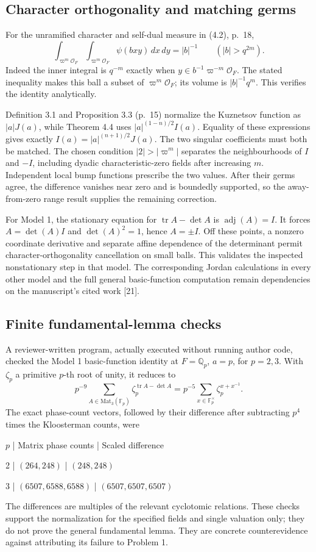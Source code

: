 \documentclass[10pt]{article}
\begin{document}
\subsection*{Character orthogonality and matching germs}
For the unramified character and self-dual measure in (4.2), p. 18, \[\int_{\varpi^m\mathcal O_F}\int_{\varpi^m\mathcal O_F}
 \psi(bxy)\,dx\,dy=|b|^{-1}\qquad (|b|>q^{2m}).\] Indeed the inner integral is \(q^{-m}\) exactly when \(y\in b^{-1}\varpi^{-m}\mathcal O_F\). The stated inequality makes this ball a subset of \(\varpi^m\mathcal O_F\); its volume is \(|b|^{-1}q^m\). This verifies the identity analytically.\par
Definition 3.1 and Proposition 3.3 (p. 15) normalize the Kuznetsov function as \(|a|J(a)\), while Theorem 4.4 uses \(|a|^{(1-n)/2}I(a)\). Equality of these expressions gives exactly \(I(a)=|a|^{(n+1)/2}J(a)\). The two singular coefficients must both be matched. The chosen condition \(|2|>|\varpi^m|\) separates the neighbourhoods of \(I\) and \(-I\), including dyadic characteristic-zero fields after increasing \(m\). Independent local bump functions prescribe the two values. After their germs agree, the difference vanishes near zero and is boundedly supported, so the away-from-zero range result supplies the remaining correction.\par
For Model 1, the stationary equation for \(\operatorname{tr}A-\det A\) is \(\operatorname{adj}(A)=I\). It forces \(A=\det(A)I\) and \(\det(A)^2=1\), hence \(A=\pm I\). Off these points, a nonzero coordinate derivative and separate affine dependence of the determinant permit character-orthogonality cancellation on small balls. This validates the inspected nonstationary step in that model. The corresponding Jordan calculations in every other model and the full general basic-function computation remain dependencies on the manuscript’s cited work [21].\par
\subsection*{Finite fundamental-lemma checks}
A reviewer-written program, actually executed without running author code, checked the Model 1 basic-function identity at \(F=\mathbb Q_p\), \(a=p\), for \(p=2,3\). With \(\zeta_p\) a primitive \(p\)-th root of unity, it reduces to \[p^{-9}\sum_{A\in\mathrm{Mat}_3(\mathbb F_p)}
 \zeta_p^{\operatorname{tr}A-\det A}
 =p^{-5}\sum_{x\in\mathbb F_p^\times}\zeta_p^{x+x^{-1}}.\] The exact phase-count vectors, followed by their difference after subtracting \(p^4\) times the Kloosterman counts, were\par
\(p\) | Matrix phase counts | Scaled difference\par
2 | \((264,248)\) | \((248,248)\)\par
3 | \((6507,6588,6588)\) | \((6507,6507,6507)\)\par
The differences are multiples of the relevant cyclotomic relations. These checks support the normalization for the specified fields and single valuation only; they do not prove the general fundamental lemma. They are concrete counterevidence against attributing its failure to Problem 1.\par
\end{document}
